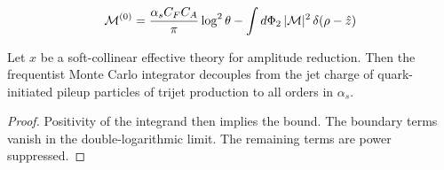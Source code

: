 \begin{equation}
  \mathcal{M}^{(0)} = \frac{\alpha_s C_F C_A}{\pi} \log^2 \theta - \int d\Phi_{2} \, |\mathcal{M}|^2 \, \delta(\rho - \hat{z})
  \label{eq:5}
\end{equation}

\begin{corollary}\label{thm:4}
Let $x$ be a soft-collinear effective theory for amplitude reduction.
Then the frequentist Monte Carlo integrator decouples from the jet
charge of quark-initiated pileup particles of trijet production to all
orders in $\alpha_s$.
\end{corollary}

\begin{proof}
Positivity of the integrand then implies the bound. The boundary terms
vanish in the double-logarithmic limit. The remaining terms are power
suppressed.
\end{proof}

